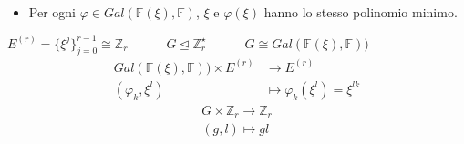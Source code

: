 \documentclass[mathserif]{beamer}
\newtheorem{teorema}{Teorema}
\begin{document}

\begin{frame}
\begin{itemize}
   \item Per ogni $\varphi \in Gal(\mathbb{F}(\xi), \mathbb{F})$, $\xi$ e $\varphi(\xi)$ hanno lo stesso
      polinomio minimo.
\end{itemize}

   $E^{(r)} = \lbrace \xi^{j}\rbrace_{j=0}^{r-1}\cong \mathbb{Z}_{r}
   \qquad \quad
   G \trianglelefteq \mathbb{Z}_{r}^{\star}
   \qquad  \quad
   G \cong Gal(\mathbb{F}(\xi), \mathbb{F}))$
   \vspace{0.5cm}
   \begin{align*}
	Gal(\mathbb{F}(\xi), \mathbb{F})) \times E^{(r)}  & \longrightarrow  E^{(r)}   \\
		  (\varphi_{k},\xi^{l}) & \longmapsto \varphi_{k}(\xi^{l}) = \xi^{lk}
    \end{align*}
    \begin{align*}
	G \times \mathbb{Z}_{r} \longrightarrow  \mathbb{Z}_{r}   \\
		  (g,l) \longmapsto gl
    \end{align*}
\end{frame}
\end{document}
